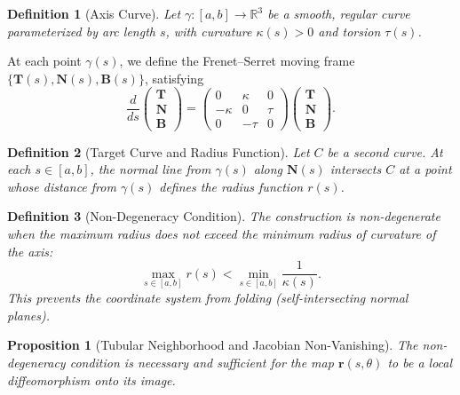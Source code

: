 \documentclass[11pt,twoside]{article}
\newtheorem{proposition}{Proposition}
\newtheorem{definition}{Definition}
\begin{document}
\begin{definition}[Axis Curve]
	Let $\gamma: [a, b] \to \mathbb{R}^3$ be a smooth, regular curve parameterized by arc length $s$, with curvature $\kappa(s) > 0$ and torsion $\tau(s)$.
\end{definition}

At each point $\gamma(s)$, we define the Frenet--Serret moving frame \cite{DoCarmo} $\{\mathbf{T}(s), \mathbf{N}(s), \mathbf{B}(s)\}$, satisfying
\begin{equation}
	\frac{d}{ds}
	\begin{pmatrix} \mathbf{T} \\ \mathbf{N} \\ \mathbf{B} \end{pmatrix}
	=
	\begin{pmatrix} 0 & \kappa & 0 \\ -\kappa & 0 & \tau \\ 0 & -\tau & 0 \end{pmatrix}
	\begin{pmatrix} \mathbf{T} \\ \mathbf{N} \\ \mathbf{B} \end{pmatrix}.
\end{equation}

\begin{definition}[Target Curve and Radius Function]
	Let $C$ be a second curve. At each $s \in [a, b]$, the normal line from $\gamma(s)$ along $\mathbf{N}(s)$ intersects $C$ at a point whose distance from $\gamma(s)$ defines the \emph{radius function} $r(s)$.
\end{definition}

\begin{definition}[Non-Degeneracy Condition]
	The construction is non-degenerate when the maximum radius does not exceed the minimum radius of curvature of the axis:
	\begin{equation}
		\max_{s \in [a,b]} r(s) < \min_{s \in [a,b]} \frac{1}{\kappa(s)}.
	\end{equation}
	This prevents the coordinate system from folding (self-intersecting normal planes).
\end{definition}

\begin{proposition}[Tubular Neighborhood and Jacobian Non-Vanishing]
	The non-degeneracy condition is necessary and sufficient for the map $\mathbf{r}(s, \theta)$ to be a local diffeomorphism onto its image.
\end{proposition}
\end{document}
